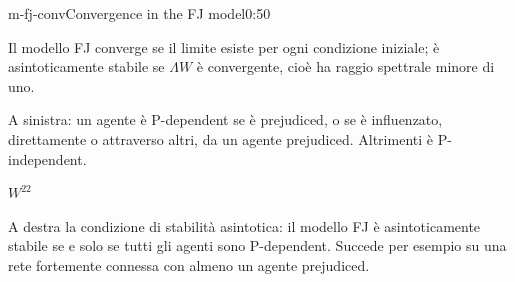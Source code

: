 \begin{slide}{m-fj-conv}{Convergence in the FJ model}{0:50 {\color{red}}}
  \begin{discorso}
    \item Il modello FJ converge se il limite esiste per ogni condizione {\color{red} } {\color{blue}iniziale;} è asintoticamente stabile se $\Lambda W$ è convergente, cioè ha raggio spettrale minore di uno.
    \item {\color{red}       } {\color{blue}A sinistra:} un agente {\color{blue}è P-dependent se è} prejudiced, {\color{red}} {\color{blue}o se è} influenzato, direttamente o attraverso altri, da un agente prejudiced. {\color{red}  } {\color{blue}Altrimenti è} P-independent.
    \item {\color{red}                }
    \item {\color{red}                         } {\color{red}$W^{22}$} {\color{red}               }
    \item {\color{red}   } {\color{blue}A destra la condizione} di {\color{red}    } {\color{blue}stabilità asintotica:} il modello {\color{blue}FJ} è asintoticamente stabile se e solo se tutti gli agenti sono P-dependent. {\color{red}} {\color{blue}Succede per} esempio {\color{red} } {\color{blue}su una} rete {\color{red}} fortemente connessa {\color{red}} {\color{blue}con} almeno un agente {\color{red}} prejudiced. {\color{red}    }

\end{discorso}
\end{slide}
